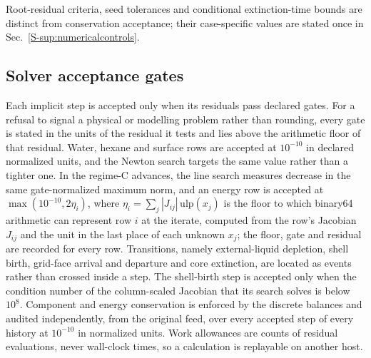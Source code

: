 Root-residual criteria, seed tolerances and conditional extinction-time
bounds are distinct from conservation acceptance; their case-specific
values are stated once in Sec.~\ref*{S-sup:numericalcontrols}.

\subsection{Solver acceptance gates}
\label{sec:numerics:gates}
Each implicit step is accepted only when its residuals pass declared gates.
For a refusal to signal a physical or modelling problem rather than
rounding, every gate is stated in the units of the residual it tests and
lies above the arithmetic floor of that residual. Water,
hexane and surface rows are accepted at $10^{-10}$ in declared normalized
units, and the Newton search targets the same value rather than a tighter
one. In the regime-C advances, the line search measures decrease in the
same gate-normalized maximum norm, and an energy row is accepted at
$\max(10^{-10},2\eta_i)$, where
$\eta_i=\sum_j|J_{ij}|\,\mathrm{ulp}(x_j)$ is the floor to which
binary64 arithmetic can represent row $i$ at the iterate, computed from the
row's Jacobian $J_{ij}$ and the unit in the last place of each unknown
$x_j$; the floor, gate and residual are recorded for every row.
Transitions, namely external-liquid depletion, shell birth, grid-face
arrival and departure and core extinction, are located as events rather
than crossed inside a step. The shell-birth step is accepted only when the
condition number of the column-scaled Jacobian that its search solves is
below $10^{8}$. Component and energy conservation is enforced by the
discrete balances and audited independently, from the original feed, over
every accepted step of every history at $10^{-10}$ in normalized units.
Work allowances are counts of residual evaluations, never wall-clock
times, so a calculation is replayable on another host.
